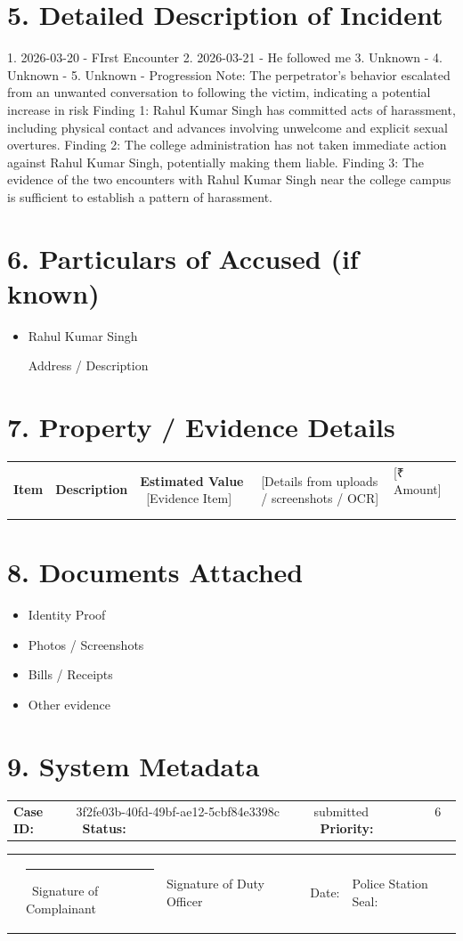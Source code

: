 \documentclass[11pt, a4paper]{article}
\begin{document}
\section{5. Detailed Description of Incident}
1. 2026-03-20 - FIrst Encounter
2. 2026-03-21 - He followed me
3. Unknown - 
4. Unknown - 
5. Unknown - 
Progression Note: The perpetrator's behavior escalated from an unwanted conversation to following the victim, indicating a potential increase in risk
Finding 1: Rahul Kumar Singh has committed acts of harassment, including physical contact and advances involving unwelcome and explicit sexual overtures.
Finding 2: The college administration has not taken immediate action against Rahul Kumar Singh, potentially making them liable.
Finding 3: The evidence of the two encounters with Rahul Kumar Singh near the college campus is sufficient to establish a pattern of harassment.

\section{6. Particulars of Accused (if known)}
\begin{itemize}
  \item Rahul Kumar Singh
  \item [Address / Description]
\end{itemize}

\section{7. Property / Evidence Details}
\begin{tabular}{lll}
    \textbf{Item} & \textbf{Description} & \textbf{Estimated Value} \
  [Evidence Item] & [Details from uploads / screenshots / OCR] & [₹ Amount] \
\end{tabular}

\section{8. Documents Attached}
\begin{itemize}
    \item Identity Proof\n    \item Photos / Screenshots\n    \item Bills / Receipts\n    \item Other evidence
\end{itemize}

\section{9. System Metadata}
\begin{tabular}{ll}
  \textbf{Case ID:} & 3f2fe03b-40fd-49bf-ae12-5cbf84e3398c \
  \textbf{Status:} & submitted \
  \textbf{Priority:} & 6 \
\end{tabular}

\vspace{1cm}
\noindent
\begin{tabular}{@{}p{}p{}@{}}
    \rule{6cm}{0.4pt} & \rule{6cm}{0.4pt} \
    Signature of Complainant & Signature of Duty Officer \
    & \
    Date: & Police Station Seal: \
\end{tabular}
\end{document}
